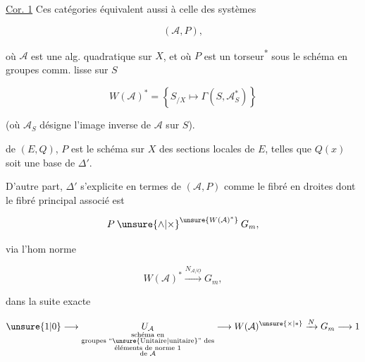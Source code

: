 
\uline{Cor. 1} Ces catégories équivalent aussi à celle  des systèmes

\[
(\mathcal A,P),
\]

où $\mathcal A$ est une alg. quadratique sur $X$, et où $P$ est un torseur\textsuperscript{*} sous le schéma en groupes comm. lisse  sur $S$


\[
W(\mathcal A)^*=\left\{S_{/X}\longmapsto\Gamma(S,\mathcal A_S^*)\right\}
\]

(où $\mathcal A_S$ désigne l'image inverse de $\mathcal A$ sur $S$).

 de $(E,Q)$, $P$ est le schéma sur $X$ des sections locales de $E$, telles que $Q(x)$ soit une base de $\Delta'$.

D'autre part, $\Delta'$ s'explicite en termes de $(\mathcal A,P)$ comme le fibré en droites dont le fibré principal associé est

\[
P\mathbin{\unsure{\wedge|\times}}^{\unsure{W(\mathcal A)^*}}G_m,
\]

via l'hom norme

\[
W(\mathcal A)^*\xrightarrow{N_{\mathcal A/\underline O}}G_m,
\]

 dans la suite exacte

\[
\unsure{1|0}\longrightarrow\underset{\substack{\text{schéma en}\\\text{groupes }\text{``\unsure{Unitaire|unitaire}''}\text{ des}\\\text{éléments de norme }1\\\text{de }\mathcal A}}{U_{\mathcal A}}\longrightarrow W(\mathcal A)^{\unsure{\times|*}}\xrightarrow{N}G_m\longrightarrow1
\]
